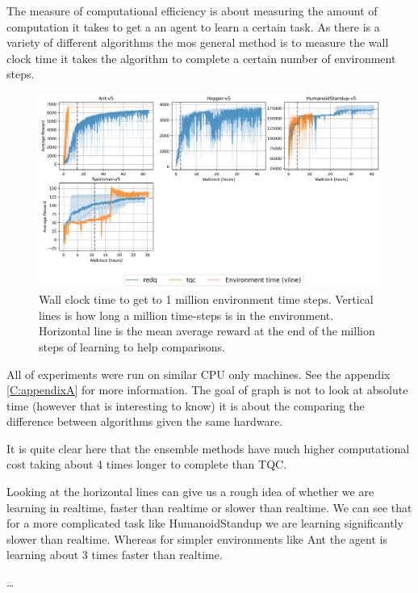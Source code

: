 The measure of computational efficiency is about measuring the amount of computation it takes to get a an agent to learn a certain task. As there is a variety of different algorithms the mos general method is to measure the wall clock time it takes the algorithm to complete a certain number of environment steps.

\begin{figure}[H]
    \centering
    \includegraphics[width=1\textwidth]{figures/wall_clock_results.png}
    \caption{Wall clock time to get to 1 million environment time steps. Vertical lines is how long a million time-steps is in the environment. Horizontal line is the mean average reward at the end of the million steps of learning to help comparisons.}
    \label{fig:sample_efficiency}
\end{figure}

All of experiments were run on similar CPU only machines. See the appendix \ref{C:appendixA} for more information. The goal of graph is not to look at absolute time (however that is interesting to know) it is about the comparing the difference between algorithms given the same hardware.

It is quite clear here that the ensemble methods have much higher computational cost taking about 4 times longer to complete than TQC.

Looking at the horizontal lines can give us a rough idea of whether we are learning in realtime, faster than realtime or slower than realtime. We can see that for a more complicated task like HumanoidStandup we are learning significantly slower than realtime. Whereas for simpler environments like Ant the agent is learning about 3 times faster than realtime.

\dots
